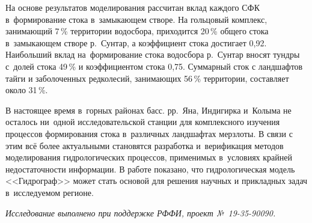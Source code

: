 На основе результатов моделирования рассчитан вклад каждого СФК в~формирование стока в~замыкающем створе. На гольцовый комплекс, занимающий 7\,\% территории водосбора, приходится 20\,\% общего стока в~замыкающем створе р.~Сунтар, а коэффициент стока достигает 0,92. Наибольший вклад на~формирование стока водосбора р.~Сунтар вносят тундры с~долей стока 49\,\% и коэффициентом стока 0,75. Суммарный сток с ландшафтов тайги и заболоченных редколесий, занимающих 56\,\% территории, составляет около 31\,\%.

В настоящее время в~горных районах басс. рр.~Яна, Индигирка и~Колыма не осталось ни~одной исследовательской станции для комплексного изучения процессов формирования стока в~различных ландшафтах мерзлоты. В связи с этим всё более актуальными становятся разработка и~верификация методов моделирования гидрологических процессов, применимых в~условиях крайней недостаточности информации. В работе показано, что гидрологическая модель <<Гидрограф>> может стать основой для решения научных и прикладных задач в~исследуемом регионе.

\textit{Исследование выполнено при поддержке РФФИ, проект №~19-35-90090.}

